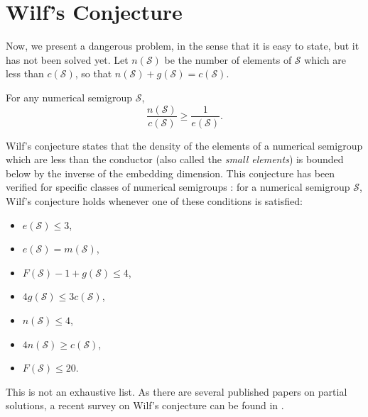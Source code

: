 \section{Wilf's Conjecture}\label{sec:smgps:theme2}

Now, we present a dangerous problem, in the sense that it is easy to state, but it has not been solved yet. Let $n(\mathcal{S})$ be the number of elements of $\mathcal{S}$ which are less than $c(\mathcal{S})$, so that $n(\mathcal{S}) + g(\mathcal{S}) = c(\mathcal{S})$.\par 

\begin{conjecture}[Wilf, 1978] \cite{wilf1978circle}\label{conj:smgps:wilf}
    For any numerical semigroup $\mathcal{S}$,
    \[\frac{n(\mathcal{S})}{c(\mathcal{S})} \geq \frac{1}{e(\mathcal{S})}.\]
\end{conjecture}

Wilf's conjecture states that the density of the elements of a numerical semigroup which are less than the conductor (also called the \textit{small elements}) is bounded below by the inverse of the embedding dimension. This conjecture has been verified for specific classes of numerical semigroups \cite{assi2020numerical}: for a numerical semigroup $\mathcal{S}$, Wilf's conjecture holds whenever one of these conditions is satisfied:
\begin{itemize}
    \item $e(\mathcal{S}) \leq 3$,
    \item $e(\mathcal{S}) = m(\mathcal{S})$,
    \item $F(\mathcal{S}) - 1 + g(\mathcal{S}) \leq 4$,
    \item $4g(\mathcal{S}) \leq 3c(\mathcal{S})$,
    \item $n(\mathcal{S}) \leq 4$,
    \item $4n(\mathcal{S}) \geq c(\mathcal{S})$,
    \item $F(\mathcal{S}) \leq 20$.
\end{itemize}

This is not an exhaustive list. As there are several published papers on partial solutions, a recent survey on Wilf's conjecture can be found in \cite{2020conjecture}. \par